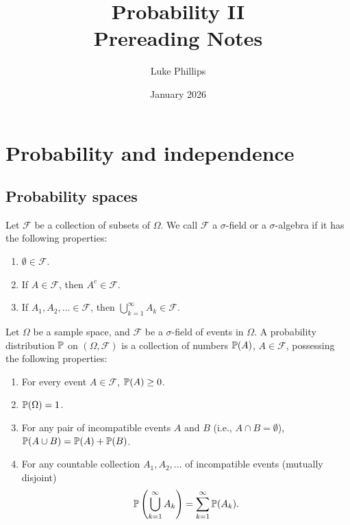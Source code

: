 \documentclass[10pt, a4paper]{article}
\title{Probability II \\
    \large Prereading Notes}
\author{Luke Phillips}
\date{January 2026}
\begin{document}
\maketitle

\newpage

\tableofcontents

\newpage

\section{Probability and independence}

\subsection{Probability spaces}

\begin{definition}
    Let $\mathcal{F}$ be a collection of subsets of $\Omega$.
    We call $\mathcal{F}$ a $\sigma$-field or a $\sigma$-algebra if it has the following properties:
    \begin{enumerate}[label = \arabic*.]
        \item $\emptyset \in \mathcal{F}$.

        \item If $A \in \mathcal{F}$,
        then $A ^ c \in \mathcal{F}$.

        \item If $A_1, A_2, \dotsc \in \mathcal{F}$,
        then $\bigcup_{k = 1}^{\infty}A_k \in \mathcal{F}$.
    \end{enumerate}
\end{definition}

\begin{definition}[Probability]
    Let $\Omega$ be a sample space,
    and $\mathcal{F}$ be a $\sigma$-field of events in $\Omega$.
    A probability distribution $\P$ on $(\Omega, \mathcal{F})$ is a collection of numbers $\P(A)$,
    $A \in \mathcal{F}$,
    possessing the following properties:
    \begin{enumerate}[label = A\arabic*]
        \item For every event $A \in \mathcal{F}$,
        $\P(A) \geq 0$.

        \item $\P(\Omega) = 1$.

        \item For any pair of incompatible events $A$ and $B$
        (i.e.,
        $A \cap B = \emptyset$),
        $\P(A \cup B) = \P(A) + \P(B)$.

        \item For any countable collection $A_1, A_2, \dotsc$ of incompatible events
        (mutually disjoint)
        \[
        \P\left(\bigcup_{k = 1}^{\infty}A_k\right) = \sum_{k = 1}^{\infty}\P(A_k).
        \]
    \end{enumerate}
\end{definition}
\end{document}
